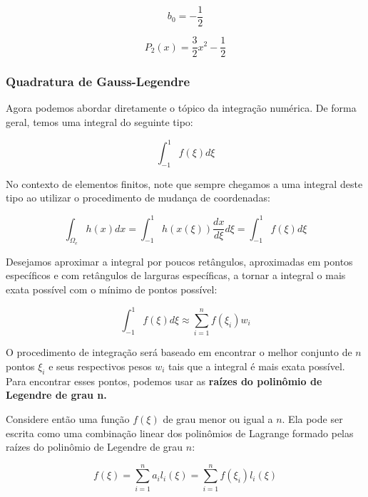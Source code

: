         \begin{equation*}
            b_0= -\frac{1}{2}
        \end{equation*}

        \begin{equation*}
            P_2(x) = \frac{3}{2}x^2 - \frac{1}{2}
        \end{equation*}


        \subsubsection{Quadratura de Gauss-Legendre}

        Agora podemos abordar diretamente o tópico da integração numérica. De forma geral, temos uma integral do seguinte tipo:
        
        \begin{equation}
            \int_{-1}^{1} f(\xi) d\xi
        \end{equation}

        No contexto de elementos finitos, note que sempre chegamos a uma integral deste tipo ao utilizar o procedimento de mudança de coordenadas:

        \begin{equation}
            \int_{\Omega_e} h(x) dx = \int_{-1}^{1} h(x(\xi)) \frac{dx}{d\xi} d\xi = \int_{-1}^{1} f(\xi) d\xi
        \end{equation}

        Desejamos aproximar a integral por poucos retângulos, aproximadas em pontos específicos e com retângulos de larguras específicas, a tornar a integral o mais exata possível com o mínimo de pontos possível:

        \begin{equation}
            \int_{-1}^{1} f(\xi) d\xi \approx \sum_{i=1}^n f(\xi_i) w_i
        \end{equation}

        O procedimento de integração será baseado em encontrar o melhor conjunto de $n$ pontos $\xi_i$ e seus respectivos pesos $w_i$ tais que a integral é mais exata possível. Para encontrar esses pontos, podemos usar as \textbf{raízes do polinômio de Legendre de grau n.}

        Considere então uma função $f(\xi)$ de grau menor ou igual a $n$. Ela pode ser escrita como uma combinação linear dos polinômios de Lagrange formado pelas raízes do polinômio de Legendre de grau $n$:

        \begin{equation}
            f(\xi) = \sum_{i=1}^n a_i l_i(\xi) = \sum_{i=1}^n f(\xi_i) l_i(\xi)
        \end{equation}


